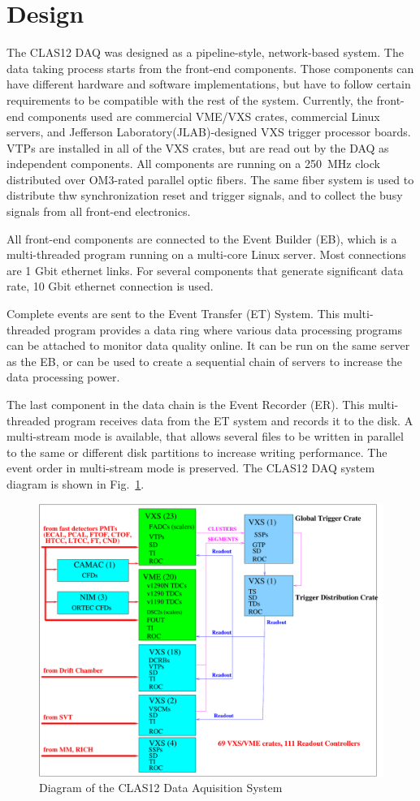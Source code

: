 \section{Design}

The CLAS12 DAQ was designed as a pipeline-style, network-based system. The data taking process starts from the front-end components. Those components can have different hardware and software implementations, but have to follow certain requirements to be compatible with the rest of the system. Currently, the front-end components used are commercial VME/VXS crates, commercial Linux servers, and Jefferson Laboratory(JLAB)-designed VXS trigger processor boards. VTPs are installed in all of the VXS crates, but are read out by the DAQ as independent components. All components are running on a 250~MHz clock distributed over OM3-rated parallel optic fibers. The same fiber system is used to distribute thw synchronization reset and trigger signals, and to collect the busy signals from all front-end electronics.

All front-end components are connected to the Event Builder (EB), which is a multi-threaded program running on a multi-core Linux server. Most connections are 1 Gbit ethernet links. For several components that generate significant data rate, 10 Gbit ethernet connection is used.

Complete events are sent to the Event Transfer (ET) System. This multi-threaded program provides a data ring where various data processing programs can be attached to monitor data quality online. It can be run on the same server as the EB, or can be used to create a sequential chain of servers to increase the data processing power.

The last component in the data chain is the Event Recorder (ER). This multi-threaded program receives data from the ET system and records it to the disk. A multi-stream mode is available, that allows several files to be written in parallel to the same or different disk partitions to increase writing performance. The event order in multi-stream mode is preserved. The CLAS12 DAQ system diagram is shown in Fig.~\ref{fig:DAQdiagram}.

\begin{figure}[hbt]
	\centering
	\includegraphics[width=1.0\columnwidth,keepaspectratio]{img/CLAS12_HARDWARE_2.pdf}
	\caption{Diagram of the CLAS12 Data Aquisition System}
	\label{fig:DAQdiagram}
\end{figure}


